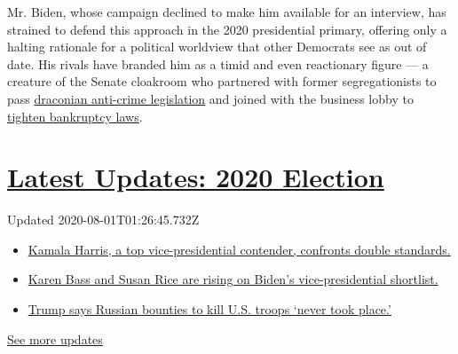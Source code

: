 Mr. Biden, whose campaign declined to make him available for an
interview, has strained to defend this approach in the 2020 presidential
primary, offering only a halting rationale for a political worldview
that other Democrats see as out of date. His rivals have branded him as
a timid and even reactionary figure --- a creature of the Senate
cloakroom who partnered with former segregationists to pass
\href{https://www.nytimes.com/2019/06/25/us/joe-biden-crime-laws.html}{draconian
anti-crime legislation} and joined with the business lobby to
\href{https://www.nytimes.com/2015/08/31/us/politics/banking-ties-could-hurt-joe-biden-in-race-with-populist-overtone.html}{tighten
bankruptcy laws}.

\hypertarget{latest-updates-2020-election}{%
\section{\texorpdfstring{\href{https://www.nytimes.com/2020/07/31/us/elections/biden-vs-trump.html?action=click\&pgtype=Article\&state=default\&region=MAIN_CONTENT_1\&context=storylines_live_updates}{Latest
Updates: 2020
Election}}{Latest Updates: 2020 Election}}\label{latest-updates-2020-election}}

Updated 2020-08-01T01:26:45.732Z

\begin{itemize}
\tightlist
\item
  \href{https://www.nytimes.com/2020/07/31/us/elections/biden-vs-trump.html?action=click\&pgtype=Article\&state=default\&region=MAIN_CONTENT_1\&context=storylines_live_updates\#link-29fdff45}{Kamala
  Harris, a top vice-presidential contender, confronts double
  standards.}
\item
  \href{https://www.nytimes.com/2020/07/31/us/elections/biden-vs-trump.html?action=click\&pgtype=Article\&state=default\&region=MAIN_CONTENT_1\&context=storylines_live_updates\#link-13ec3d9c}{Karen
  Bass and Susan Rice are rising on Biden's vice-presidential
  shortlist.}
\item
  \href{https://www.nytimes.com/2020/07/31/us/elections/biden-vs-trump.html?action=click\&pgtype=Article\&state=default\&region=MAIN_CONTENT_1\&context=storylines_live_updates\#link-49e9a016}{Trump
  says Russian bounties to kill U.S. troops `never took place.'}
\end{itemize}

\href{https://www.nytimes.com/2020/07/31/us/elections/biden-vs-trump.html?action=click\&pgtype=Article\&state=default\&region=MAIN_CONTENT_1\&context=storylines_live_updates}{See
more updates}

